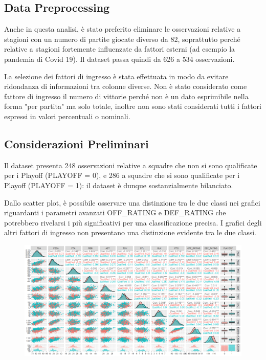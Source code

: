 \documentclass[11pt,a4paper]{article}
\begin{document}
\subsection{Data Preprocessing}
Anche in questa analisi, è stato preferito eliminare le osservazioni relative a stagioni con un numero di partite giocate diverso da 82, soprattutto perché relative a stagioni fortemente influenzate da fattori esterni (ad esempio la pandemia di Covid 19). 
Il dataset passa quindi da 626 a 534 osservazioni.

La selezione dei fattori di ingresso è stata effettuata in modo da evitare ridondanza di informazioni tra colonne diverse.
Non è stato considerato come fattore di ingresso il numero di vittorie perché non è un dato esprimibile nella forma "per partita" ma solo totale, inoltre non sono stati considerati tutti i fattori espressi in valori percentuali o nominali.

\subsection{Considerazioni Preliminari}
Il dataset presenta 248 osservazioni relative a squadre che non si sono qualificate per i Playoff (PLAYOFF = 0), e 286 a squadre che si sono qualificate per i Playoff (PLAYOFF = 1): il dataset è dunque sostanzialmente bilanciato.

Dallo scatter plot, è possibile osservare una distinzione tra le due classi nei grafici riguardanti i parametri avanzati OFF\_RATING e DEF\_RATING che potrebbero rivelarsi i più significativi per una classificazione precisa. I grafici degli altri fattori di ingresso non presentano una distinzione evidente tra le due classi.
\begin{figure}[h]
    \hspace{-1.7cm}
	\includegraphics[scale=0.55]{imgs/scatter_plot.png}
    \end{figure}
\vspace{-0.4cm}
\end{document}
